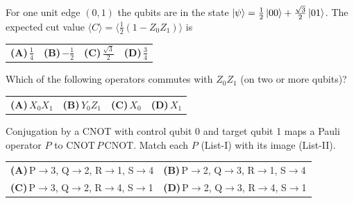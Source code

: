 \documentclass[11pt,a4paper]{article}
\newcommand{\optlabel}[1]{\textbf{(#1)}}
\newenvironment{qitem}[1]{\begin{list}{}{\setlength{\leftmargin}{3.3em}\setlength{\labelwidth}{3.1em}%
  \setlength{\labelsep}{0.2em}\setlength{\topsep}{3pt}\setlength{\parsep}{3pt}}\item[\textbf{Q.#1}\hfill]}{\end{list}}
\newcommand{\qsep}{\par\vspace{2pt}{\color{black!15}\hrule}\vspace{4pt}}
\begin{document}
\begin{qitem}{25}
For one unit edge $(0,1)$ the qubits are in the state $\ket\psi = \tfrac12\ket{00} + \tfrac{\sqrt3}{2}\ket{01}$. The expected
cut value $\langle C\rangle = \big\langle \tfrac12(1 - Z_0Z_1)\big\rangle$ is
\par\smallskip\noindent\begin{tabularx}{\linewidth}{@{}*{4}{L}@{}}
\optlabel{A}\,$\tfrac14$ & \optlabel{B}\,$-\tfrac12$ & \optlabel{C}\,$\tfrac{\sqrt3}{2}$ & \optlabel{D}\,$\tfrac34$
\end{tabularx}
\end{qitem}
\qsep

\begin{qitem}{26}
Which of the following operators commutes with $Z_0Z_1$ (on two or more qubits)?
\par\smallskip\noindent\begin{tabularx}{\linewidth}{@{}*{4}{L}@{}}
\optlabel{A}\,$X_0X_1$ & \optlabel{B}\,$Y_0Z_1$ & \optlabel{C}\,$X_0$ & \optlabel{D}\,$X_1$
\end{tabularx}
\end{qitem}
\qsep

\begin{qitem}{27}
Conjugation by a CNOT with control qubit 0 and target qubit 1 maps a Pauli operator $P$ to
$\mathrm{CNOT}\,P\,\mathrm{CNOT}$. Match each $P$ (List-I) with its image (List-II).
\par\smallskip{}
\par\smallskip\noindent\begin{tabularx}{\linewidth}{@{}*{2}{L}@{}}
\optlabel{A}\,P$\to$3, Q$\to$2, R$\to$1, S$\to$4 & \optlabel{B}\,P$\to$2, Q$\to$3, R$\to$1, S$\to$4 \\[3pt]
\optlabel{C}\,P$\to$3, Q$\to$2, R$\to$4, S$\to$1 & \optlabel{D}\,P$\to$2, Q$\to$3, R$\to$4, S$\to$1
\end{tabularx}
\end{qitem}
\qsep
\end{document}
